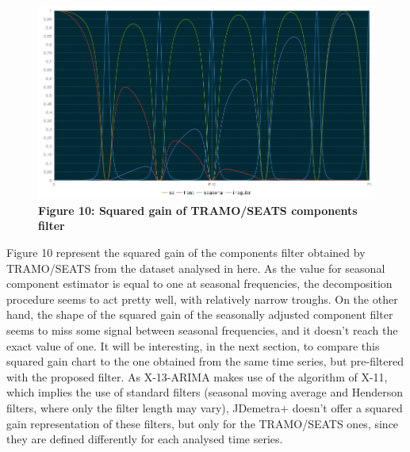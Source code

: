 \documentclass{article}
\begin{document}
\begin{figure}[H]
\centering
  \includegraphics[width=\linewidth]{../images/capitolo3/squaredgain.jpg}
  {\textbf{\scriptsize Figure 10: Squared gain of TRAMO/SEATS components filter}}
\end{figure}
Figure 10 represent the squared gain of the components filter obtained by TRAMO/SEATS from the dataset analysed in here. As the value for seasonal component estimator is equal to one at seasonal frequencies, the decomposition procedure seems to act pretty well, with relatively narrow troughs. On the other hand, the shape of the squared gain of the seasonally adjusted component filter seems to miss some signal between seasonal frequencies, and it doesn't reach the exact value of one. It will be interesting, in the next section, to compare this squared gain chart to the one obtained from the same time series, but pre-filtered with the proposed filter.
As X-13-ARIMA makes use of the algorithm of X-11, which implies the use of standard filters (seasonal moving average and Henderson filters, where only the filter length may vary), JDemetra+ doesn't offer a squared gain representation of these filters, but only for the TRAMO/SEATS ones, since they are defined differently for each analysed time series.
\end{document}
